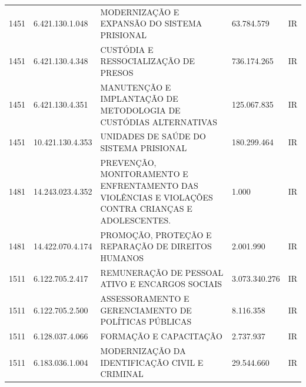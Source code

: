 \documentclass{article}
\begin{document}
\begin{longtable}[c]{m{1cm}|m{2cm}|m{10cm}|m{2cm}|m{1cm}}
\multicolumn{1}{C{1cm}|}{1451} & \multicolumn{1}{C{2cm}|}{6.421.130.1.048} & \multicolumn{1}{L{10cm}|}{MODERNIZAÇÃO E EXPANSÃO DO SISTEMA PRISIONAL} & \multicolumn{1}{R{2cm}|}{63.784.579} & \multicolumn{1}{C{1cm}}{IR} \\
\multicolumn{1}{C{1cm}|}{1451} & \multicolumn{1}{C{2cm}|}{6.421.130.4.348} & \multicolumn{1}{L{10cm}|}{CUSTÓDIA E RESSOCIALIZAÇÃO DE PRESOS} & \multicolumn{1}{R{2cm}|}{736.174.265} & \multicolumn{1}{C{1cm}}{IR} \\
\multicolumn{1}{C{1cm}|}{1451} & \multicolumn{1}{C{2cm}|}{6.421.130.4.351} & \multicolumn{1}{L{10cm}|}{MANUTENÇÃO E IMPLANTAÇÃO DE METODOLOGIA DE CUSTÓDIAS ALTERNATIVAS} & \multicolumn{1}{R{2cm}|}{125.067.835} & \multicolumn{1}{C{1cm}}{IR} \\
\multicolumn{1}{C{1cm}|}{1451} & \multicolumn{1}{C{2cm}|}{10.421.130.4.353} & \multicolumn{1}{L{10cm}|}{UNIDADES DE SAÚDE DO SISTEMA PRISIONAL} & \multicolumn{1}{R{2cm}|}{180.299.464} & \multicolumn{1}{C{1cm}}{IR} \\
\multicolumn{1}{C{1cm}|}{1481} & \multicolumn{1}{C{2cm}|}{14.243.023.4.352} & \multicolumn{1}{L{10cm}|}{PREVENÇÃO, MONITORAMENTO E ENFRENTAMENTO DAS VIOLÊNCIAS E VIOLAÇÕES CONTRA CRIANÇAS E ADOLESCENTES.} & \multicolumn{1}{R{2cm}|}{1.000} & \multicolumn{1}{C{1cm}}{IR} \\
\multicolumn{1}{C{1cm}|}{1481} & \multicolumn{1}{C{2cm}|}{14.422.070.4.174} & \multicolumn{1}{L{10cm}|}{PROMOÇÃO, PROTEÇÃO E REPARAÇÃO DE DIREITOS HUMANOS} & \multicolumn{1}{R{2cm}|}{2.001.990} & \multicolumn{1}{C{1cm}}{IR} \\
\multicolumn{1}{C{1cm}|}{1511} & \multicolumn{1}{C{2cm}|}{6.122.705.2.417} & \multicolumn{1}{L{10cm}|}{REMUNERAÇÃO DE PESSOAL ATIVO E ENCARGOS SOCIAIS} & \multicolumn{1}{R{2cm}|}{3.073.340.276} & \multicolumn{1}{C{1cm}}{IR} \\
\multicolumn{1}{C{1cm}|}{1511} & \multicolumn{1}{C{2cm}|}{6.122.705.2.500} & \multicolumn{1}{L{10cm}|}{ASSESSORAMENTO E GERENCIAMENTO DE POLÍTICAS PÚBLICAS} & \multicolumn{1}{R{2cm}|}{8.116.358} & \multicolumn{1}{C{1cm}}{IR} \\
\multicolumn{1}{C{1cm}|}{1511} & \multicolumn{1}{C{2cm}|}{6.128.037.4.066} & \multicolumn{1}{L{10cm}|}{FORMAÇÃO E CAPACITAÇÃO} & \multicolumn{1}{R{2cm}|}{2.737.937} & \multicolumn{1}{C{1cm}}{IR} \\
\multicolumn{1}{C{1cm}|}{1511} & \multicolumn{1}{C{2cm}|}{6.183.036.1.004} & \multicolumn{1}{L{10cm}|}{MODERNIZAÇÃO DA IDENTIFICAÇÃO CIVIL E CRIMINAL} & \multicolumn{1}{R{2cm}|}{29.544.660} & \multicolumn{1}{C{1cm}}{IR} \\

\end{longtable}
\end{document}
